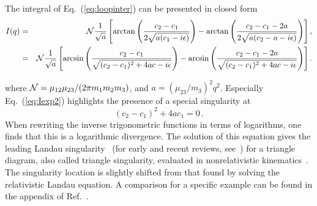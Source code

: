 \begin{widetext}
The integral of Eq.~(\ref{eq:loopinter}) can be presented in closed 
form~\cite{Guo:2010ak,Mehen:2015efa}
\begin{eqnarray}
    I(q) &=& {\cal N} \frac{1}{\sqrt{a}} \left[
\arctan\left(\frac{c_2-c_1}{2\sqrt{a(c_1-i\epsilon)}}\right) -
\arctan\left(\frac{c_2-c_1-2a}{2\sqrt{a(c_2-a-i\epsilon)}}\right) \right],
    \label{eq:Iexp} \\
    &=& {\cal N} \frac{1}{\sqrt{a}} \left[
\arcsin\left(\frac{c_2-c_1}{\sqrt{(c_2-c_1)^2+4ac-i\epsilon}}\right)
    - 
\arcsin\left(\frac{c_2-c_1-2a}{\sqrt{(c_2-c_1)^2+4ac-i\epsilon}}\right)
\right].
    \label{eq:Iexp2}
\end{eqnarray}
\end{widetext}
where ${\cal N}=\mu_{12}\mu_{23}/(2\pi m_1m_2m_3)$, and
$a = \left(\mu_{23}/m_3\right)^2 { q}^2$.
Especially Eq.~(\ref{eq:Iexp2}) highlights the presence of a special singularity
at
\begin{equation}
  (c_2-c_1)^2+4ac_1 = 0 \, .
  \label{eq:nrtrising}
\end{equation}
When rewriting the inverse trigonometric functions in terms of 
logarithms, one finds that this is a logarithmic divergence.
The solution of this equation gives the leading Landau 
singularity~\cite{Landau:1959fi} (for early
and recent reviews, see~\cite{Eden:1966,Chang:1983,Aitchison:2015jxa})
for a triangle diagram, also called triangle singularity, evaluated 
in nonrelativistic kinematics~\cite{Guo:2014qra}. The singularity location is 
slightly 
shifted from that found by solving the relativistic Landau equation. A 
comparison for a specific example can be found in the appendix of 
Ref.~\cite{Guo:2014qra}.  

